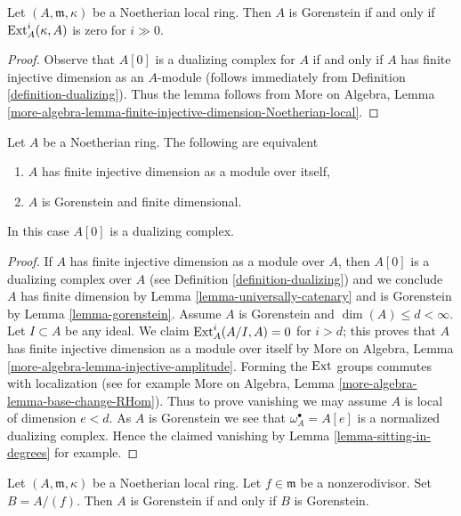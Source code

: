 \begin{lemma}
\label{lemma-gorenstein-ext}
Let $(A, \mathfrak m, \kappa)$ be a Noetherian local ring.
Then $A$ is Gorenstein if and only if $\mathop{\mathrm{Ext}}\nolimits^i_A(\kappa, A)$
is zero for $i \gg 0$.
\end{lemma}

\begin{proof}
Observe that $A[0]$ is a dualizing complex for $A$ if and only
if $A$ has finite injective dimension as an $A$-module
(follows immediately from Definition \ref{definition-dualizing}).
Thus the lemma follows from More on Algebra, Lemma
\ref{more-algebra-lemma-finite-injective-dimension-Noetherian-local}.
\end{proof}

\begin{lemma}
\label{lemma-characterize-gorenstein}
Let $A$ be a Noetherian ring. The following are equivalent
\begin{enumerate}
\item $A$ has finite injective dimension as a module over itself,
\item $A$ is Gorenstein and finite dimensional.
\end{enumerate}
In this case $A[0]$ is a dualizing complex.
\end{lemma}

\begin{proof}
If $A$ has finite injective dimension as a module over $A$, then
$A[0]$ is a dualizing complex over $A$
(see Definition \ref{definition-dualizing})
and we conclude $A$ has finite dimension by
Lemma \ref{lemma-universally-catenary} and
is Gorenstein by Lemma \ref{lemma-gorenstein}.
Assume $A$ is Gorenstein and $\dim(A) \leq d < \infty$.
Let $I \subset A$ be any ideal. We claim $\mathop{\mathrm{Ext}}\nolimits^i_A(A/I, A) = 0$
for $i > d$; this proves that $A$ has finite injective
dimension as a module over itself by
More on Algebra, Lemma \ref{more-algebra-lemma-injective-amplitude}.
Forming the $\mathop{\mathrm{Ext}}\nolimits$ groups commutes with localization (see for example
More on Algebra, Lemma \ref{more-algebra-lemma-base-change-RHom}).
Thus to prove vanishing we may assume $A$ is local of
dimension $e < d$. As $A$ is Gorenstein we see that
$\omega_A^\bullet = A[e]$ is a normalized dualizing complex.
Hence the claimed vanishing by Lemma \ref{lemma-sitting-in-degrees}
for example.
\end{proof}

\begin{lemma}
\label{lemma-gorenstein-divide-by-nonzerodivisor}
Let $(A, \mathfrak m, \kappa)$
be a Noetherian local ring. Let $f \in \mathfrak m$ be a
nonzerodivisor. Set $B = A/(f)$. Then $A$ is Gorenstein if and
only if $B$ is Gorenstein.
\end{lemma}

